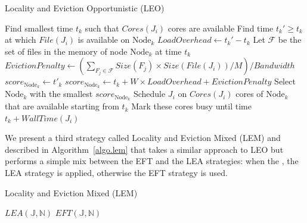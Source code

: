 \documentclass[sigconf,review,anonymous]{acmart}
\newcommand{\rev}[1]{{\color{blue}{#1}}}
\newcommand{\Node}[1]{\ensuremath{\mathrm{Node}_{#1}}\xspace}
\newcommand{\file}{\ensuremath{\mathit{File}}\xspace}
\newcommand{\size}{\ensuremath{\mathit{Size}}\xspace}
\newcommand{\memory}{\ensuremath{\mathit{M}}\xspace}
\newcommand{\bandwidth}{\mathit{Bandwidth}\xspace}
\newcommand{\core}{\mathit{Cores}\xspace}
\newcommand{\walltime}{\mathit{WallTime}\xspace}
\newcommand{\jobset}{\ensuremath{\mathbb{J}}\xspace}
\newcommand{\nodeset}{\ensuremath{\mathbb{N}}\xspace}
\begin{document}
\begin{algorithm}[t]%
\caption{Locality and Eviction Opportunistic (LEO)}\label{algo.leo}
\begin{algorithmic}[1]
		\ForEach{$\Node{k} \in \nodeset$}
			\State Find smallest time $t_k$ such that $\core(J_i)$ cores are available
			\State Find time $t_k'\geq t_k$ at which $\file(J_i)$ is available on $\Node{k}$
			\State $\mathit{LoadOverhead} \gets t_k' - t_k$ %
                        \State Let $\mathcal{F}$ be the set of files in the memory of node \Node{k} at time $t_k$
			\State $\mathit{EvictionPenalty} \gets (\sum_{F_j\in\mathcal{F}}\size(F_j) \times \size(\file(J_i))/\memory)/\bandwidth$
				\State $score_{\Node{k}} \gets t'_k$
			\Else
			         \State $score_{\Node{k}} \gets t_k + W \times \mathit{LoadOverhead} + \mathit{EvictionPenalty}$
			\EndIf
		\EndFor
                \State Select \Node{k} with the smallest $score_{\Node{k}}$
                \State Schedule $J_i$ on $\core(J_i)$ cores of \Node{k} that are available starting from $t_k$
                \State Mark these cores busy until time $t_k +\walltime(J_i)$
	\EndFor
\end{algorithmic}
\end{algorithm}

We present a third strategy called Locality and Eviction Mixed (LEM)
and described in Algorithm~\ref{algo.lem} that takes a similar approach to
LEO but performs a simple mix between the EFT and the LEA strategies:
when the \rev{platform is saturated (each node is running
at least one job)}, the LEA strategy is applied,
otherwise the EFT strategy is used.
 

\begin{algorithm}[htbp]%
\caption{Locality and Eviction Mixed (LEM)}\label{algo.lem}
\begin{algorithmic}[1]
		\If{\rev{each node is running at least one job at current time}}
			\State $LEA(\jobset,\nodeset)$
		\Else
			\State $EFT(\jobset,\nodeset)$
		\EndIf
	\EndFor
\end{algorithmic}
\end{algorithm}
\end{document}
